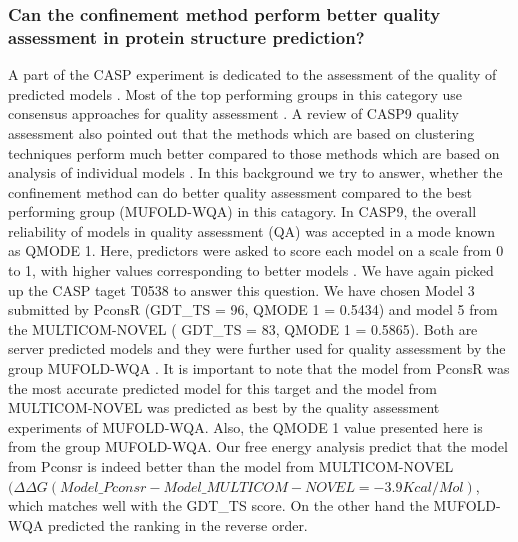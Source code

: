 \documentclass[12pt]{article}
\begin{document}
\subsubsection{Can the confinement method perform better quality assessment in protein structure prediction?}
A part of the CASP experiment is dedicated to the assessment of the quality of predicted models \cite{Kryshtafovych2011}. 
Most of the top performing groups in this category use consensus approaches for quality assessment \cite{Wang2011}.
A review of CASP9 quality assessment also pointed out that the methods which are based on clustering
techniques perform
much better compared to those methods which are based on analysis of individual models \cite{Kryshtafovych2011}. 
In this background we try to answer, whether the confinement method can do better quality assessment
compared to the best performing
group (MUFOLD-WQA) in this catagory. In CASP9, the overall reliability of models in quality assessment (QA) was accepted in a mode known as
QMODE 1. Here, predictors were asked to score each model on a scale from 0 to 1, with higher values corresponding to better models \cite{Kryshtafovych2011}. 
We have again picked up the CASP taget T0538 to answer this question. We have chosen Model 3 submitted by PconsR (GDT\_TS = 96, QMODE 1 = 0.5434) 
and model 5 from the MULTICOM-NOVEL ( GDT\_TS = 83, QMODE 1 = 0.5865). Both are server predicted models and they were further used for quality assessment 
by the group MUFOLD-WQA \cite{Wang2011}. It is important to note that the model from PconsR was the most accurate predicted model for this 
target and the model from MULTICOM-NOVEL was predicted as best by the quality assessment experiments of MUFOLD-WQA. Also, 
the QMODE 1 value presented here is from the group MUFOLD-WQA. 
Our free energy analysis predict that the model from Pconsr is indeed better than the model from 
MULTICOM-NOVEL $(\Delta \Delta G (Model\_Pconsr - Model\_MULTICOM-NOVEL = -3.9 Kcal/Mol)$, which   
matches well with the GDT\_TS score. On the other hand the MUFOLD-WQA predicted the ranking in the reverse order. 
\end{document}
